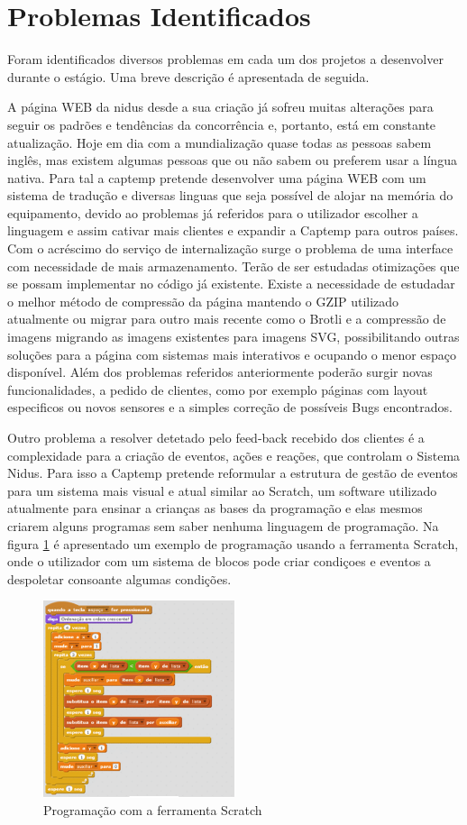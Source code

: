 \section{Problemas Identificados}
Foram identificados diversos problemas em cada um dos projetos a desenvolver durante o estágio. Uma breve descrição é apresentada de seguida.
\par
A página WEB da nidus desde a sua criação já sofreu muitas alterações para seguir os padrões e tendências da concorrência e, portanto, está em constante atualização. Hoje em dia com a mundialização quase todas as pessoas sabem inglês, mas existem algumas pessoas que ou não sabem ou preferem usar a língua nativa. Para tal a captemp pretende desenvolver uma página WEB com um sistema de tradução e diversas linguas que seja possível de alojar na memória do equipamento, devido ao problemas já referidos para o utilizador escolher a linguagem e assim cativar mais clientes e expandir a Captemp para outros países. Com o acréscimo do serviço de internalização surge o problema de uma interface com necessidade de mais armazenamento. Terão de ser estudadas otimizações que se possam implementar no código já existente. Existe a necessidade de estudadar o melhor método de compressão da página mantendo o GZIP utilizado atualmente ou migrar para outro mais recente como o Brotli e a compressão de imagens migrando as imagens existentes para imagens SVG, possibilitando outras soluções para a página com sistemas mais interativos e ocupando o menor espaço disponível. Além dos problemas referidos anteriormente poderão surgir novas funcionalidades, a pedido de clientes, como por exemplo páginas com layout especificos ou novos sensores e a simples correção de possíveis Bugs encontrados.
\par
Outro problema a resolver detetado pelo feed-back recebido dos clientes é a complexidade para a criação de eventos, ações e reações, que controlam o Sistema Nidus. Para isso a Captemp pretende reformular a estrutura de gestão de eventos para um sistema mais visual  e atual similar ao Scratch, um software utilizado atualmente para ensinar a crianças as bases da programação e elas mesmos criarem alguns programas sem saber nenhuma linguagem de programação. Na figura \ref{scratch} é apresentado um exemplo de programação usando a ferramenta Scratch, onde o utilizador com um sistema de blocos pode criar condiçoes e eventos a despoletar consoante algumas condições.
\begin{figure}[ht]
  \centering
  \includegraphics[width=0.50\textwidth]{images/scratch.png}
  \caption{ Programação com a ferramenta Scratch}\label{scratch}
\end{figure}
